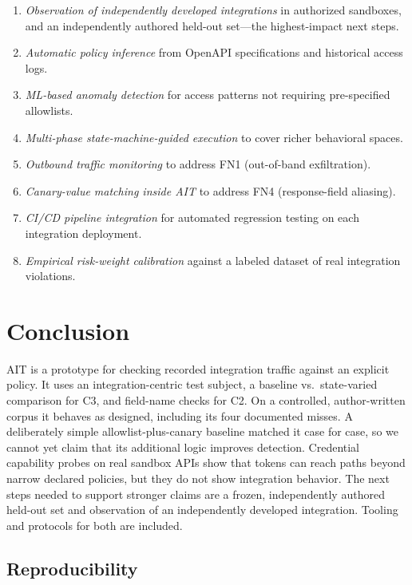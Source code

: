 \documentclass[conference]{IEEEtran}
\begin{document}
\begin{enumerate}
  \item \emph{Observation of independently developed integrations} in
        authorized sandboxes, and an independently authored held-out
        set---the highest-impact next steps.
  \item \emph{Automatic policy inference} from OpenAPI specifications
        and historical access logs.
  \item \emph{ML-based anomaly detection} for access patterns not
        requiring pre-specified allowlists.
  \item \emph{Multi-phase state-machine-guided execution} to cover
        richer behavioral spaces.
  \item \emph{Outbound traffic monitoring} to address FN1
        (out-of-band exfiltration).
  \item \emph{Canary-value matching inside AIT} to address FN4
        (response-field aliasing).
  \item \emph{CI/CD pipeline integration} for automated regression
        testing on each integration deployment.
  \item \emph{Empirical risk-weight calibration} against a labeled
        dataset of real integration violations.
\end{enumerate}

\section{Conclusion}
\label{sec:conc}

AIT is a prototype for checking recorded integration traffic against an
explicit policy. It uses an integration-centric test subject, a baseline
vs.\ state-varied comparison for C3, and field-name checks for C2. On a
controlled, author-written corpus it behaves as designed, including its
four documented misses. A deliberately simple allowlist-plus-canary
baseline matched it case for case, so we cannot yet claim that its
additional logic improves detection. Credential capability probes on real
sandbox APIs show that tokens can reach paths beyond narrow declared
policies, but they do not show integration behavior. The next steps
needed to support stronger claims are a frozen, independently authored
held-out set and observation of an independently developed integration.
Tooling and protocols for both are included.

\subsection*{Reproducibility}
\label{sec:repro}
\end{document}
